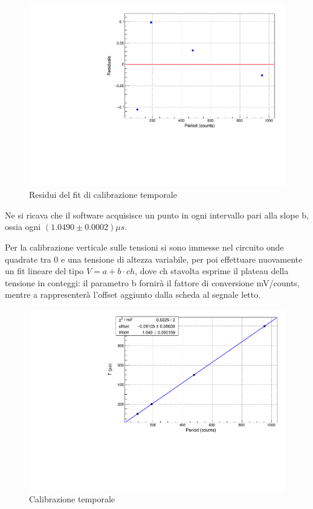 \documentclass{article}
\begin{document}
\begin{center}
\begin{figure}[H]
\centering
\includegraphics[scale=0.4, angle=0]{calibtempiresidui.pdf}
\caption{Residui del fit di calibrazione temporale}
\label{fig:calibtempiresidui}
\end{figure}
\end{center}

Ne si ricava che il software acquisisce un punto in ogni intervallo pari alla slope b, ossia ogni $(1.0490 \pm 0.0002)\mu s$.

Per la calibrazione verticale sulle tensioni si sono immesse nel circuito onde quadrate tra 0 e una tensione di altezza variabile, 
per poi effettuare nuovamente un fit lineare del tipo $V = a + b \cdot ch$, dove ch stavolta esprime il plateau della tensione 
in conteggi: il parametro b fornirà il fattore di conversione mV/counts, mentre a rappresenterà l'offset aggiunto dalla scheda al 
segnale letto.

\begin{center}
\begin{figure}[H]
\centering
\includegraphics[scale=0.4, angle=0]{calibtempi.pdf}
\caption{Calibrazione temporale}
\label{fig:calibtempi}
\end{figure}
\end{center}
\end{document}
